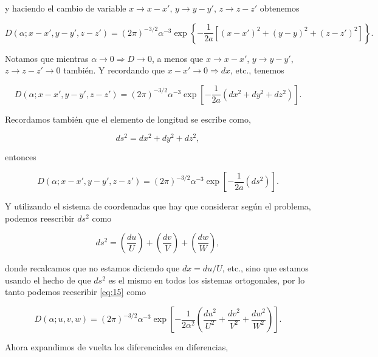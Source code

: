 \documentclass[a4paper,10pt]{article}
\numberwithin{equation}{section}
\begin{document}
y haciendo el cambio de variable $x \rightarrow x-x'$, $y \rightarrow y-y'$, 
$z \rightarrow z-z'$ obtenemos 

\begin{equation*}
 D(\alpha;x-x',y-y',z-z') = (2\pi)^{-3/2}\alpha^{-3}
 \exp\left\{-\frac{1}{2a}[(x-x')^2 + (y-y)^2 + (z-z')^2] \right\}.
\end{equation*}

Notamos que mientras $\alpha \rightarrow 0 \Rightarrow D \rightarrow 0$, a 
menos que  $x \rightarrow x-x'$, $y \rightarrow y-y'$, $z \rightarrow z-z' 
\rightarrow 0$ también. Y recordando que $x-x' \rightarrow 0 \Rightarrow dx$, etc., 
tenemos 

\begin{equation}
 D(\alpha;x-x',y-y',z-z') = (2\pi)^{-3/2}\alpha^{-3}
 \exp\left[-\frac{1}{2a}(dx^2 + dy^2 + dz^2) \right].
\end{equation}

Recordamos también que el elemento de longitud se escribe como, 

\begin{equation}
 ds^2 = dx^2 + dy^2 + dz^2,
\end{equation}

entonces 

\begin{equation}
 D(\alpha;x-x',y-y',z-z') = (2\pi)^{-3/2}\alpha^{-3}
 \exp\left[-\frac{1}{2a}(ds^2) \right].
 \label{eq:15}
\end{equation}

Y utilizando el sistema de coordenadas que hay que considerar según el problema, 
podemos reescribir $ds^2$ como 

\begin{equation}
 ds^2 = \left(\frac{du}{U}\right) + \left(\frac{dv}{V}\right) + 
 \left(\frac{dw}{W}\right),
\end{equation}

donde recalcamos que no estamos diciendo que $dx = du/U$, etc., sino que estamos 
usando el hecho de que $ds^2$ es el mismo en todos los sistemas ortogonales, 
por lo tanto podemos reescribir \eqref{eq:15} como 

\begin{equation}
 D(\alpha;u,v,w) = (2\pi)^{-3/2}\alpha^{-3}
 \exp\left[-\frac{1}{2\alpha^2}\left(\frac{du^2}{U^2} + 
 \frac{dv^2}{V^2} + \frac{dw^2}{W^2}\right) \right].
\end{equation}

Ahora expandimos de vuelta los diferenciales en diferencias, 
\end{document}
